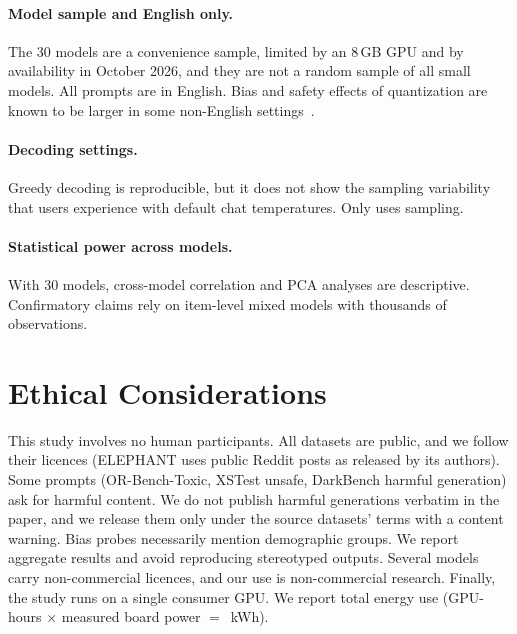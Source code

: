 \paragraph{Model sample and English only.} The 30 models are a convenience sample,
limited by an 8\,GB GPU and by availability in October 2026, and they are not a random
sample of all small models. All prompts are in English. Bias and safety effects of
quantization are known to be larger in some non-English settings~\citep{alhakim2026preserving,ferrara2026quantibias}.

\paragraph{Decoding settings.} Greedy decoding is reproducible, but it does not show
the sampling variability that users experience with default chat temperatures. Only
 uses sampling.

\paragraph{Statistical power across models.} With 30 models, cross-model correlation
and PCA analyses are descriptive. Confirmatory claims rely on item-level mixed
models with thousands of observations.


\section{Ethical Considerations}
\label{sec:ethics}
This study involves no human participants. All datasets are public, and we follow
their licences (ELEPHANT uses public Reddit posts as released by its authors). Some
prompts (OR-Bench-Toxic, XSTest unsafe, DarkBench harmful generation) ask for harmful
content. We do not publish harmful generations verbatim in the paper, and we release
them only under the source datasets' terms with a content warning. Bias probes
necessarily mention demographic groups. We report aggregate results and avoid
reproducing stereotyped outputs. Several models carry non-commercial licences, and
our use is non-commercial research. Finally, the study runs on a single consumer
GPU. We report total energy use (GPU-hours $\times$ measured board power $=$ \TBD\,kWh).
